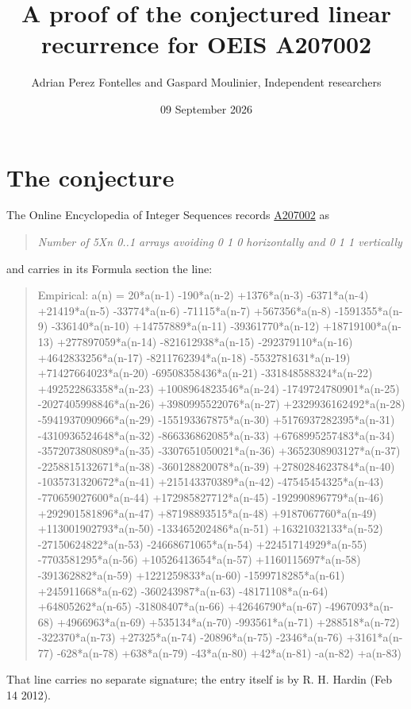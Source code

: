 \documentclass[11pt]{article}
\title{A proof of the conjectured linear recurrence for OEIS A207002}
\author{Adrian Perez Fontelles and Gaspard Moulinier, Independent researchers}
\date{09 September 2026}
\theoremstyle{definition}
\begin{document}
\maketitle
\section{The conjecture}

The Online Encyclopedia of Integer Sequences records \href{https://oeis.org/A207002}{A207002} as

\begin{quote}\itshape Number of 5Xn 0..1 arrays avoiding 0 1 0 horizontally and 0 1 1 vertically\end{quote}

and carries in its Formula section the line:

\begin{quote}\ttfamily Empirical: a(n) = 20*a(n-1) -190*a(n-2) +1376*a(n-3) -6371*a(n-4) +21419*a(n-5) -33774*a(n-6) -71115*a(n-7) +567356*a(n-8) -1591355*a(n-9) -336140*a(n-10) +14757889*a(n-11) -39361770*a(n-12) +18719100*a(n-13) +277897059*a(n-14) -821612938*a(n-15) -292379110*a(n-16) +4642833256*a(n-17) -8211762394*a(n-18) -5532781631*a(n-19) +71427664023*a(n-20) -69508358436*a(n-21) -331848588324*a(n-22) +492522863358*a(n-23) +1008964823546*a(n-24) -1749724780901*a(n-25) -2027405998846*a(n-26) +3980995522076*a(n-27) +2329936162492*a(n-28) -5941937090966*a(n-29) -155193367875*a(n-30) +5176937282395*a(n-31) -4310936524648*a(n-32) -866336862085*a(n-33) +6768995257483*a(n-34) -3572073808089*a(n-35) -3307651050021*a(n-36) +3652308903127*a(n-37) -2258815132671*a(n-38) -360128820078*a(n-39) +2780284623784*a(n-40) -1035731320672*a(n-41) +215143370389*a(n-42) -47545454325*a(n-43) -770659027600*a(n-44) +172985827712*a(n-45) -192990896779*a(n-46) +292901581896*a(n-47) +87198893515*a(n-48) +9187067760*a(n-49) +113001902793*a(n-50) -133465202486*a(n-51) +16321032133*a(n-52) -27150624822*a(n-53) -24668671065*a(n-54) +22451714929*a(n-55) -7703581295*a(n-56) +10526413654*a(n-57) +1160115697*a(n-58) -391362882*a(n-59) +1221259833*a(n-60) -1599718285*a(n-61) +245911668*a(n-62) -360243987*a(n-63) -48171108*a(n-64) +64805262*a(n-65) -31808407*a(n-66) +42646790*a(n-67) -4967093*a(n-68) +4966963*a(n-69) +535134*a(n-70) -993561*a(n-71) +288518*a(n-72) -322370*a(n-73) +27325*a(n-74) -20896*a(n-75) -2346*a(n-76) +3161*a(n-77) -628*a(n-78) +638*a(n-79) -43*a(n-80) +42*a(n-81) -a(n-82) +a(n-83)\end{quote}

That line carries no separate signature; the entry itself is by R. H. Hardin (Feb 14 2012).
\end{document}

